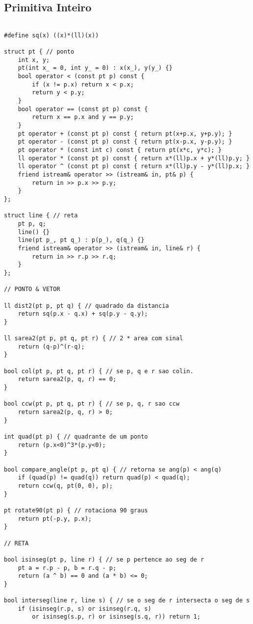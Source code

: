 \documentclass[11pt, a4paper, twoside]{article}
\begin{document}
\subsection{Primitiva Inteiro}
\begin{verbatim}

#define sq(x) ((x)*(ll)(x))

struct pt { // ponto
	int x, y;
	pt(int x_ = 0, int y_ = 0) : x(x_), y(y_) {}
	bool operator < (const pt p) const {
		if (x != p.x) return x < p.x;
		return y < p.y;
	}
	bool operator == (const pt p) const {
		return x == p.x and y == p.y;
	}
	pt operator + (const pt p) const { return pt(x+p.x, y+p.y); }
	pt operator - (const pt p) const { return pt(x-p.x, y-p.y); }
	pt operator * (const int c) const { return pt(x*c, y*c); }
	ll operator * (const pt p) const { return x*(ll)p.x + y*(ll)p.y; }
	ll operator ^ (const pt p) const { return x*(ll)p.y - y*(ll)p.x; }
	friend istream& operator >> (istream& in, pt& p) {
		return in >> p.x >> p.y;
	}
};

struct line { // reta
	pt p, q;
	line() {}
	line(pt p_, pt q_) : p(p_), q(q_) {}
	friend istream& operator >> (istream& in, line& r) {
		return in >> r.p >> r.q;
	}
};

// PONTO & VETOR

ll dist2(pt p, pt q) { // quadrado da distancia
	return sq(p.x - q.x) + sq(p.y - q.y);
}

ll sarea2(pt p, pt q, pt r) { // 2 * area com sinal
	return (q-p)^(r-q);
}

bool col(pt p, pt q, pt r) { // se p, q e r sao colin.
	return sarea2(p, q, r) == 0;
}

bool ccw(pt p, pt q, pt r) { // se p, q, r sao ccw
	return sarea2(p, q, r) > 0;
}

int quad(pt p) { // quadrante de um ponto
	return (p.x<0)^3*(p.y<0);
}

bool compare_angle(pt p, pt q) { // retorna se ang(p) < ang(q)
	if (quad(p) != quad(q)) return quad(p) < quad(q);
	return ccw(q, pt(0, 0), p);
}

pt rotate90(pt p) { // rotaciona 90 graus
	return pt(-p.y, p.x);
}

// RETA

bool isinseg(pt p, line r) { // se p pertence ao seg de r
	pt a = r.p - p, b = r.q - p;
	return (a ^ b) == 0 and (a * b) <= 0;
}

bool interseg(line r, line s) { // se o seg de r intersecta o seg de s
	if (isinseg(r.p, s) or isinseg(r.q, s)
		or isinseg(s.p, r) or isinseg(s.q, r)) return 1;
    

\end{verbatim}
\end{document}
